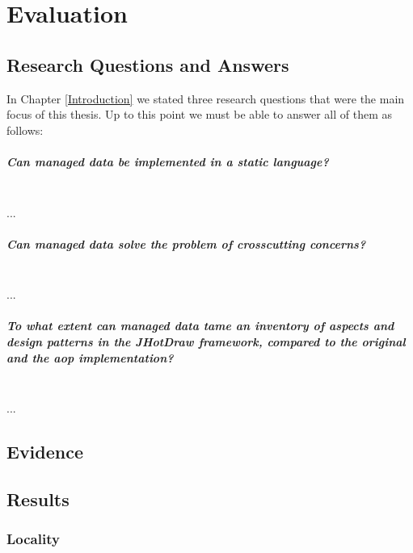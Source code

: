 
\chapter{Evaluation}\label{Evaluation}

\section{Research Questions and Answers}\label{Research Questions and Answers}
In Chapter \ref{Introduction} we stated three research questions that were the main focus of this thesis.
Up to this point we must be able to answer all of them as follows:

\paragraph{Can managed data be implemented in a static language?}\mbox{}\\
...

\paragraph{Can managed data solve the problem of crosscutting concerns?}\mbox{}\\
...

\paragraph{To what extent can managed data tame an inventory of aspects and design patterns in the JHotDraw framework, compared to the original and the \ac{aop} implementation?}\mbox{}\\
...

\section{Evidence}\label{Evidence}

\section{Results}\label{Results}

\subsection{Locality}
